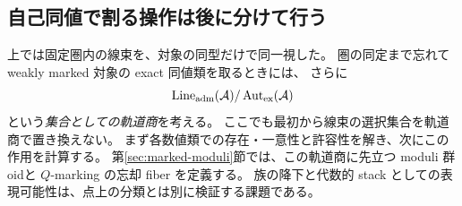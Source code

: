 \subsection{自己同値で割る操作は後に分けて行う}
上では固定圏内の線束を、対象の同型だけで同一視した。
圏の同定まで忘れて weakly marked 対象の exact 同値類を取るときには、
さらに
\begin{equation}\label{eq:set-exact-orbits}
 \operatorname{Line}_{\rm adm}(\mathcal A)/\operatorname{Aut}_{\rm ex}(\mathcal A)
\end{equation}
という\emph{集合としての軌道商}を考える。
ここでも最初から線束の選択集合を軌道商で置き換えない。
まず各数値類での存在・一意性と許容性を解き、次にこの作用を計算する。
第\ref{sec:marked-moduli}節では、この軌道商に先立つ moduli 群oidと
$Q$-marking の忘却 fiber を定義する。
族の降下と代数的 stack としての表現可能性は、点上の分類とは別に検証する課題である。
